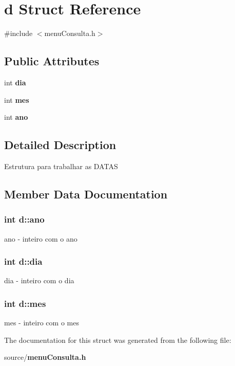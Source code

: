 \section{d Struct Reference}
\label{structd}


{\ttfamily \#include $<$menu\+Consulta.\+h$>$}

\subsection*{Public Attributes}
\begin{DoxyCompactItemize}
\item 
int {\bf dia}
\item 
int {\bf mes}
\item 
int {\bf ano}
\end{DoxyCompactItemize}


\subsection{Detailed Description}
Estrutura para trabalhar as D\+A\+T\+A\+S 

\subsection{Member Data Documentation}
\subsubsection[{ano}]{\setlength{\rightskip}{0pt plus 5cm}int d\+::ano}\label{structd_aa82cbb62970f927245034d2a27ce2e3c}
ano -\/ inteiro com o ano 
\subsubsection[{dia}]{\setlength{\rightskip}{0pt plus 5cm}int d\+::dia}\label{structd_aff4fc348e5b7b0a568ed3562e0263a02}
dia -\/ inteiro com o dia 
\subsubsection[{mes}]{\setlength{\rightskip}{0pt plus 5cm}int d\+::mes}\label{structd_ac5d0e5ddc01af8cdc8abd402d802f61c}
mes -\/ inteiro com o mes 

The documentation for this struct was generated from the following file\+:\begin{DoxyCompactItemize}
\item 
source/{\bf menu\+Consulta.\+h}\end{DoxyCompactItemize}
